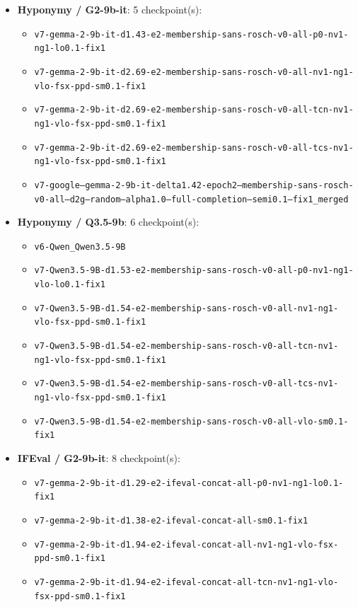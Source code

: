 \documentclass[10pt]{article}
\begin{document}
\begin{itemize}\footnotesize\setlength{\itemsep}{1pt}
\item \textbf{Hyponymy / G2-9b-it}: 5 checkpoint(s):
\begin{itemize}\tiny
\item \texttt{v7-gemma-2-9b-it-d1.43-e2-membership-sans-rosch-v0-all-p0-nv1-ng1-lo0.1-fix1}
\item \texttt{v7-gemma-2-9b-it-d2.69-e2-membership-sans-rosch-v0-all-nv1-ng1-vlo-fsx-ppd-sm0.1-fix1}
\item \texttt{v7-gemma-2-9b-it-d2.69-e2-membership-sans-rosch-v0-all-tcn-nv1-ng1-vlo-fsx-ppd-sm0.1-fix1}
\item \texttt{v7-gemma-2-9b-it-d2.69-e2-membership-sans-rosch-v0-all-tcs-nv1-ng1-vlo-fsx-ppd-sm0.1-fix1}
\item \texttt{v7-google--gemma-2-9b-it-delta1.42-epoch2--membership-sans-rosch-v0-all--d2g--random--alpha1.0--full-completion--semi0.1--fix1\_merged}
\end{itemize}
\item \textbf{Hyponymy / Q3.5-9b}: 6 checkpoint(s):
\begin{itemize}\tiny
\item \texttt{v6-Qwen\_Qwen3.5-9B}
\item \texttt{v7-Qwen3.5-9B-d1.53-e2-membership-sans-rosch-v0-all-p0-nv1-ng1-vlo-lo0.1-fix1}
\item \texttt{v7-Qwen3.5-9B-d1.54-e2-membership-sans-rosch-v0-all-nv1-ng1-vlo-fsx-ppd-sm0.1-fix1}
\item \texttt{v7-Qwen3.5-9B-d1.54-e2-membership-sans-rosch-v0-all-tcn-nv1-ng1-vlo-fsx-ppd-sm0.1-fix1}
\item \texttt{v7-Qwen3.5-9B-d1.54-e2-membership-sans-rosch-v0-all-tcs-nv1-ng1-vlo-fsx-ppd-sm0.1-fix1}
\item \texttt{v7-Qwen3.5-9B-d1.54-e2-membership-sans-rosch-v0-all-vlo-sm0.1-fix1}
\end{itemize}
\item \textbf{IFEval / G2-9b-it}: 8 checkpoint(s):
\begin{itemize}\tiny
\item \texttt{v7-gemma-2-9b-it-d1.29-e2-ifeval-concat-all-p0-nv1-ng1-lo0.1-fix1}
\item \texttt{v7-gemma-2-9b-it-d1.38-e2-ifeval-concat-all-sm0.1-fix1}
\item \texttt{v7-gemma-2-9b-it-d1.94-e2-ifeval-concat-all-nv1-ng1-vlo-fsx-ppd-sm0.1-fix1}
\item \texttt{v7-gemma-2-9b-it-d1.94-e2-ifeval-concat-all-tcn-nv1-ng1-vlo-fsx-ppd-sm0.1-fix1}

\end{itemize}
\end{itemize}
\end{document}
